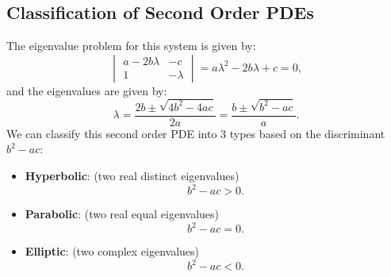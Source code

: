 \documentclass{article}
\theoremstyle{definition}
\begin{document}
\subsection{Classification of Second Order PDEs}
The eigenvalue problem for this system is given by:
\begin{equation*}
    \begin{vmatrix}
        a - 2b \lambda & -c       \\
        1              & -\lambda
    \end{vmatrix}
    = a \lambda^2 - 2b \lambda + c = 0,
\end{equation*}
and the eigenvalues are given by:
\begin{equation*}
    \lambda = \frac{2b \pm \sqrt{4b^2 - 4ac}}{2a} = \frac{b \pm \sqrt{b^2 - ac}}{a}.
\end{equation*}
We can classify this second order PDE into 3 types based on the
discriminant \(b^2 - ac\):
\begin{itemize}
    \item \textbf{Hyperbolic}: (two real distinct eigenvalues)
          \begin{equation*}
              b^2 - ac > 0.
          \end{equation*}
    \item \textbf{Parabolic}: (two real equal eigenvalues)
          \begin{equation*}
              b^2 - ac = 0.
          \end{equation*}
    \item \textbf{Elliptic}: (two complex eigenvalues)
          \begin{equation*}
              b^2 - ac < 0.
          \end{equation*}
\end{itemize}
\end{document}
